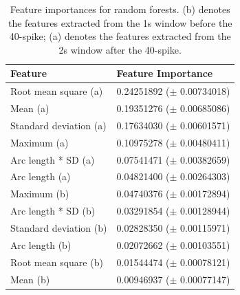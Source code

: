 \begin{table}[t]
\centering
\begin{tabular}{@{}ll@{}}
\toprule
Feature                & Feature Importance \\ \midrule
Root mean square (a)   & 0.24251892 ($\pm$ 0.00734018)         \\
Mean (a)               & 0.19351276 ($\pm$ 0.00685086)         \\
Standard deviation (a) & 0.17634030 ($\pm$ 0.00601571)         \\
Maximum (a)            & 0.10975278 ($\pm$ 0.00480411)         \\
Arc length * SD (a)    & 0.07541471 ($\pm$ 0.00382659)         \\
Arc length (a)         & 0.04821400 ($\pm$ 0.00264303)         \\
Maximum (b)            & 0.04740376 ($\pm$ 0.00172894)         \\
Arc length * SD (b)    & 0.03291854 ($\pm$ 0.00128944)         \\
Standard deviation (b) & 0.02828350 ($\pm$ 0.00115971)         \\
Arc length (b)         & 0.02072662 ($\pm$ 0.00103551)         \\
Root mean square (b)   & 0.01544474 ($\pm$ 0.00078121)         \\
Mean (b)               & 0.00946937 ($\pm$ 0.00077147)          \\ \bottomrule
\end{tabular}
\caption{Feature importances for random forests. (b) denotes the features extracted from the 1s window before the 40-spike; (a) denotes the features extracted from the 2s window after the 40-spike.}
\label{tbl:importance-rf}
\end{table}





